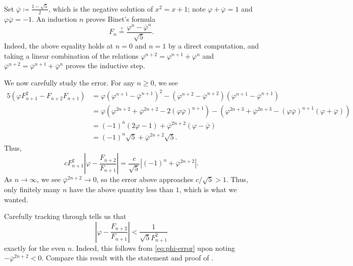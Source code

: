 \documentclass[../notes.tex]{subfiles}
\begin{document}
\begin{solution}
	Set $\overline\varphi\coloneqq\frac{1-\sqrt5}2$, which is the negative solution of $x^2=x+1$; note $\varphi+\overline\varphi=1$ and $\varphi\overline\varphi=-1$. An induction $n$ proves Binet's formula
	\[F_n\stackrel?=\frac{\varphi^n-\overline\varphi^n}{\sqrt5}.\]
	Indeed, the above equality holds at $n=0$ and $n=1$ by a direct computation, and taking a linear combination of the relations $\varphi^{n+2}=\varphi^{n+1}+\varphi^n$ and $\overline\varphi^{n+2}=\overline\varphi^{n+1}+\overline\varphi^n$ proves the inductive step.

	We now carefully study the error. For any $n\ge0$, we see
	\begin{align*}
		5\left(\varphi F_{n+1}^2-F_{n+2}F_{n+1}\right) &= \varphi\left(\varphi^{n+1}-\overline\varphi^{n+1}\right)^2-\left(\varphi^{n+2}-\overline\varphi^{n+2}\right)\left(\varphi^{n+1}-\overline\varphi^{n+1}\right) \\
		&= \varphi\left(\varphi^{2n+2}+\overline\varphi^{2n+2}-2(\varphi\overline\varphi)^{n+1}\right)-\left(\varphi^{2n+3}+\overline\varphi^{2n+3}-(\varphi\overline\varphi)^{n+1}(\varphi+\overline\varphi)\right) \\
		&= (-1)^n(2\varphi-1)+\overline\varphi^{2n+2}\left(\varphi-\overline\varphi\right) \\
		&= (-1)^n\sqrt5+\overline\varphi^{2n+2}\sqrt5.
	\end{align*}
	Thus,
	\begin{equation}
		cF_{n+1}^2\left|\varphi-\frac{F_{n+2}}{F_{n+1}}\right|=\frac c{\sqrt5}\left|(-1)^n+\overline\varphi^{2n+2}\right|. \label{eq:phi-error}
	\end{equation}
	As $n\to\infty$, we see $\overline\varphi^{2n+2}\to0$, so the error above approaches $c/\sqrt5>1$. Thus, only finitely many $n$ have the above quantity less than $1$, which is what we wanted.
\end{solution}
\begin{remark}
	Carefully tracking through  tells us that
	\[\left|\varphi-\frac{F_{n+2}}{F_{n+1}}\right|<\frac1{\sqrt5F_{n+1}^2}\]
	exactly for the even $n$. Indeed, this follows from \eqref{eq:phi-error} upon noting $-\overline\varphi^{2n+2}<0$. Compare this result with the statement and proof of .
\end{remark}
\end{document}
